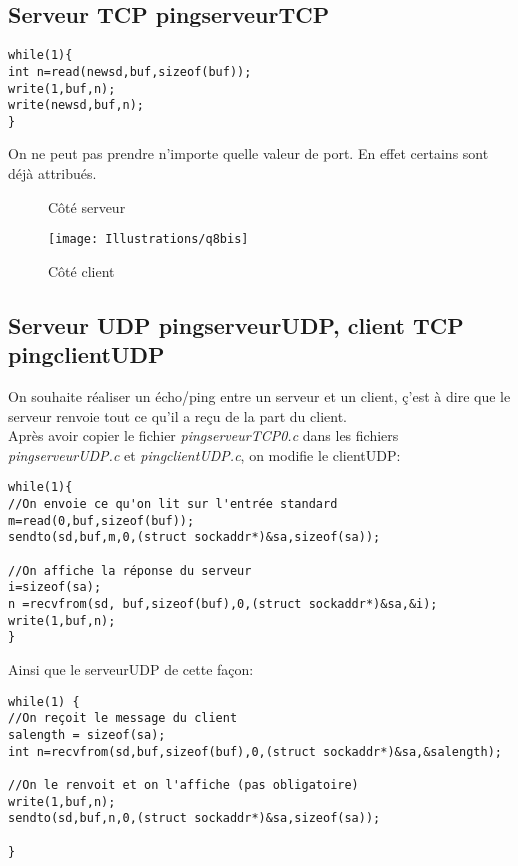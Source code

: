 \documentclass[paper=a4, fontsize=12pt]{article}
\numberwithin{equation}{section}		%
\numberwithin{figure}{section}			%
\numberwithin{table}{section}				%
\begin{document}
\subsection{Serveur TCP pingserveurTCP}
\begin{verbatim}
while(1){
int n=read(newsd,buf,sizeof(buf));
write(1,buf,n);
write(newsd,buf,n);
}
\end{verbatim}
On ne peut pas prendre n'importe quelle valeur de port. En effet certains sont déjà attribués.

\begin{figure}[h!]
\caption{\label{Illustrations/q8}Côté serveur}
\end{figure}
\newpage%
\begin{figure}[h!]
\centerline{\texttt{[image: Illustrations/q8bis]}}
\caption{\label{Illustrations/q8bis} Côté client}
\end{figure}
\subsection{Serveur UDP pingserveurUDP, client TCP pingclientUDP}
On souhaite réaliser un écho/ping entre un serveur et un client, ç'est à dire que le serveur renvoie tout ce qu'il a reçu de la part du client. 
\\Après avoir copier le fichier \textit{pingserveurTCP0.c} dans les fichiers  \textit{pingserveurUDP.c} et  \textit{pingclientUDP.c}, on modifie le clientUDP:
\begin{verbatim}
while(1){
//On envoie ce qu'on lit sur l'entrée standard
m=read(0,buf,sizeof(buf));
sendto(sd,buf,m,0,(struct sockaddr*)&sa,sizeof(sa));

//On affiche la réponse du serveur
i=sizeof(sa);
n =recvfrom(sd, buf,sizeof(buf),0,(struct sockaddr*)&sa,&i);
write(1,buf,n);
}
\end{verbatim}
Ainsi que le serveurUDP de cette façon:
\begin{verbatim}
while(1) {
//On reçoit le message du client
salength = sizeof(sa);
int n=recvfrom(sd,buf,sizeof(buf),0,(struct sockaddr*)&sa,&salength);

//On le renvoit et on l'affiche (pas obligatoire)
write(1,buf,n);
sendto(sd,buf,n,0,(struct sockaddr*)&sa,sizeof(sa));

}	
\end{verbatim}
\newpage%
\end{document}
